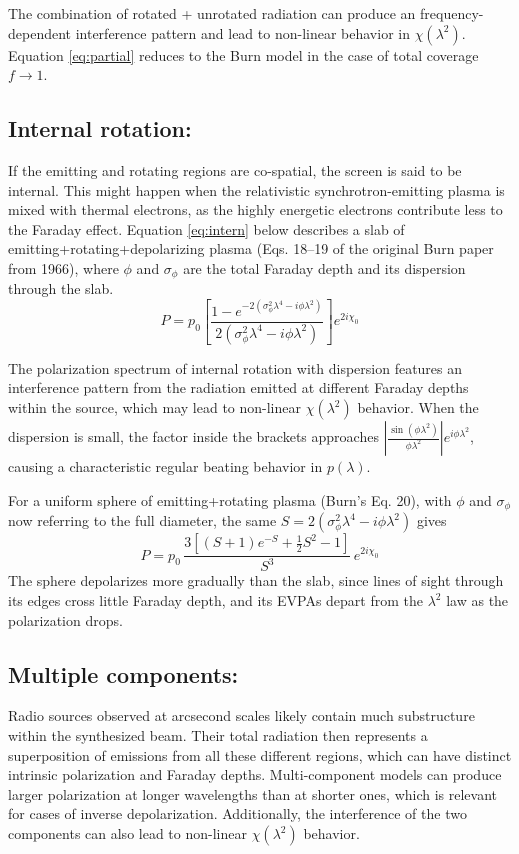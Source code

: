The combination of rotated + unrotated radiation can produce an frequency-dependent interference pattern and lead to non-linear behavior in $\chi(\lambda^2)$.
Equation \ref{eq:partial} reduces to the Burn model in the case of total coverage $f\rightarrow1$.
\\

\subsection{Internal rotation:}
If the emitting and rotating regions are co-spatial, the screen is said to be internal. This might happen when the relativistic synchrotron-emitting plasma is mixed with thermal electrons, as the highly energetic electrons contribute less to the Faraday effect.
Equation \ref{eq:intern} below describes a slab of emitting+rotating+depolarizing plasma (Eqs. 18--19 of the original Burn paper from 1966), where $\phi$ and $\sigma_\phi$ are the total Faraday depth and its dispersion through the slab.
\begin{equation}\label{eq:intern}
    \displaystyle P = p_0 \left[ \frac{1-e^{-2(\sigma_\phi^2\lambda^4-i\phi\lambda^2)}}{2(\sigma_\phi^2\lambda^4-i\phi\lambda^2)}\right] e^{2i\chi_0}
\end{equation}

The polarization spectrum of internal rotation with dispersion features an interference pattern from the radiation emitted at different Faraday depths within the source, which may lead to non-linear $\chi(\lambda^2)$ behavior.
When the dispersion is small, the factor inside the brackets approaches $|\frac{\sin(\phi\lambda^2)}{\phi\lambda^2}|e^{i\phi\lambda^2}$, causing a characteristic regular beating behavior in $p(\lambda)$.

For a uniform sphere of emitting+rotating plasma (Burn's Eq. 20), with $\phi$ and $\sigma_\phi$ now referring to the full diameter, the same $S=2(\sigma_\phi^2\lambda^4-i\phi\lambda^2)$ gives
\begin{equation}\label{eq:intern_sphere}
    \displaystyle P = p_0\, \frac{3\left[(S+1)e^{-S}+\tfrac{1}{2}S^2-1\right]}{S^3}\, e^{2i\chi_0}
\end{equation}
The sphere depolarizes more gradually than the slab, since lines of sight through its edges cross little Faraday depth, and its EVPAs depart from the $\lambda^2$ law as the polarization drops.
\\

\subsection{Multiple components:}
Radio sources observed at arcsecond scales likely contain much substructure within the synthesized beam.
Their total radiation then represents a superposition of emissions from all these different regions, which can have distinct intrinsic polarization and Faraday depths.
Multi-component models can produce larger polarization at longer wavelengths than at shorter ones, which is relevant for cases of inverse depolarization. Additionally, the interference of the two components can also lead to non-linear $\chi(\lambda^2)$ behavior.

